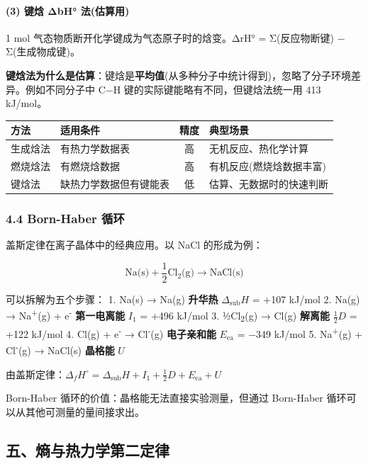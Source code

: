 \documentclass[a4paper,11pt]{ctexart}
\newcounter{none}
\begin{document}
\paragraph{(3) 键焓 ΔbH° 法(估算用)}\label{ux952eux7113-ux3b4bh-ux6cd5ux4f30ux7b97ux7528}

1 mol 气态物质断开化学键成为气态原子时的焓变。ΔrH° = Σ(反应物断键) − Σ(生成物成键)。

\textbf{键焓法为什么是估算}：键焓是\textbf{平均值}(从多种分子中统计得到)，忽略了分子环境差异。例如不同分子中 C−H 键的实际键能略有不同，但键焓法统一用 413 kJ/mol。

{\def\LTcaptype{none} %
\begin{longtable}[]{@{}llcl@{}}
\toprule\noalign{}
方法 & 适用条件 & 精度 & 典型场景 \\
\midrule\noalign{}
\endhead
\bottomrule\noalign{}
\endlastfoot
生成焓法 & 有热力学数据表 & 高 & 无机反应、热化学计算 \\
燃烧焓法 & 有燃烧焓数据 & 高 & 有机反应(燃烧焓数据丰富) \\
键焓法 & 缺热力学数据但有键能表 & 低 & 估算、无数据时的快速判断 \\
\end{longtable}
}

\subsubsection{4.4 Born-Haber 循环}\label{born-haber-ux5faaux73af}

盖斯定律在离子晶体中的经典应用。以 NaCl 的形成为例：

\[\text{Na(s)} + \frac{1}{2}\text{Cl}_2\text{(g)} \to \text{NaCl(s)}\]

可以拆解为五个步骤：
1. Na(s) → Na(g) \textbf{升华热} \(\Delta_{\text{sub}}H\) = +107 kJ/mol
2. Na(g) → Na\textsuperscript{+}(g) + e\textsuperscript{-} \textbf{第一电离能} \(I_1\) = +496 kJ/mol
3. ½Cl\textsubscript{2}(g) → Cl(g) \textbf{解离能} \(\frac{1}{2}D\) = +122 kJ/mol
4. Cl(g) + e\textsuperscript{-} → Cl\textsuperscript{-}(g) \textbf{电子亲和能} \(E_{\text{ea}}\) = −349 kJ/mol
5. Na\textsuperscript{+}(g) + Cl\textsuperscript{-}(g) → NaCl(s) \textbf{晶格能} \(U\)

由盖斯定律：\(\Delta_f H^\circ = \Delta_{\text{sub}}H + I_1 + \frac{1}{2}D + E_{\text{ea}} + U\)

Born-Haber 循环的价值：晶格能无法直接实验测量，但通过 Born-Haber 循环可以从其他可测量的量间接求出。

\subsection{五、熵与热力学第二定律}\label{ux4e94ux71b5ux4e0eux70edux529bux5b66ux7b2cux4e8cux5b9aux5f8b}
\end{document}
